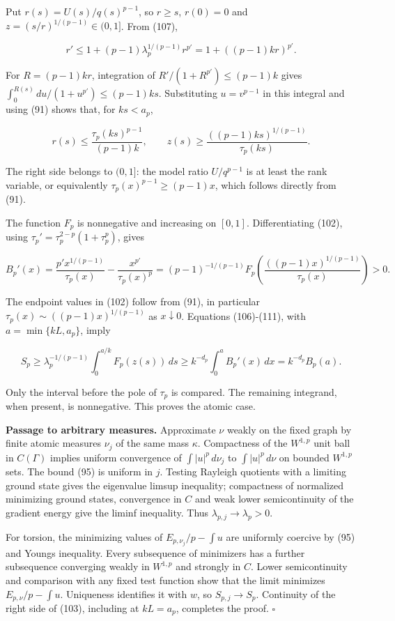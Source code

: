 \documentclass[11pt]{article}
\begin{document}
Put \(r(s)=U(s)/q(s)^{p-1}\), so \(r\ge s\), \(r(0)=0\) and
\(z=(s/r)^{1/(p-1)}\in(0,1]\). From (107),

\[
r'\le1+(p-1)\lambda_p^{1/(p-1)}r^{p'}
=1+((p-1)kr)^{p'}.
\tag{109}
\]

For \(R=(p-1)kr\), integration of \(R'/(1+R^{p'})\le(p-1)k\) gives
\(\int_0^{R(s)}du/(1+u^{p'})\le(p-1)ks\). Substituting \(u=v^{p-1}\) in
this integral and using (91) shows that, for \(ks<a_p\),

\[
r(s)\le\frac{\tau_p(ks)^{p-1}}{(p-1)k},
\qquad
z(s)\ge\frac{((p-1)ks)^{1/(p-1)}}{\tau_p(ks)}.
\tag{110}
\]

The right side belongs to \((0,1]\): the model ratio \(U/q^{p-1}\) is at
least the rank variable, or equivalently \(\tau_p(x)^{p-1}\ge(p-1)x\),
which follows directly from (91).

The function \(F_p\) is nonnegative and increasing on \([0,1]\).
Differentiating (102), using \(\tau_p'=\tau_p^{2-p}(1+\tau_p^p)\), gives

\[
B_p'(x)=\frac{p'x^{1/(p-1)}}{\tau_p(x)}
 -\frac{x^{p'}}{\tau_p(x)^p}
=(p-1)^{-1/(p-1)}
 F_p\left(\frac{((p-1)x)^{1/(p-1)}}{\tau_p(x)}\right)>0.
\tag{111}
\]

The endpoint values in (102) follow from (91), in particular
\(\tau_p(x)\sim((p-1)x)^{1/(p-1)}\) as \(x\downarrow0\). Equations
(106)-(111), with \(a=\min\{kL,a_p\}\), imply

\[
S_p\ge\lambda_p^{-1/(p-1)}\int_0^{a/k}F_p(z(s))\,ds
\ge k^{-d_p}\int_0^a B_p'(x)\,dx
=k^{-d_p}B_p(a).
\tag{112}
\]

Only the interval before the pole of \(\tau_p\) is compared. The
remaining integrand, when present, is nonnegative. This proves the
atomic case.

\textbf{Passage to arbitrary measures.} Approximate \(\nu\) weakly on
the fixed graph by finite atomic measures \(\nu_j\) of the same mass
\(\kappa\). Compactness of the \(W^{1,p}\) unit ball in \(C(\Gamma)\)
implies uniform convergence of \(\int |u|^p\,d\nu_j\) to
\(\int |u|^p\,d\nu\) on bounded \(W^{1,p}\) sets. The bound (95) is
uniform in \(j\). Testing Rayleigh quotients with a limiting ground
state gives the eigenvalue limsup inequality; compactness of normalized
minimizing ground states, convergence in \(C\) and weak lower
semicontinuity of the gradient energy give the liminf inequality. Thus
\(\lambda_{p,j}\to\lambda_p>0\).

For torsion, the minimizing values of \(E_{p,\nu_j}/p-\int u\) are
uniformly coercive by (95) and Young\textquotesingle s inequality. Every
subsequence of minimizers has a further subsequence converging weakly in
\(W^{1,p}\) and strongly in \(C\). Lower semicontinuity and comparison
with any fixed test function show that the limit minimizes
\(E_{p,\nu}/p-\int u\). Uniqueness identifies it with \(w\), so
\(S_{p,j}\to S_p\). Continuity of the right side of (103), including at
\(kL=a_p\), completes the proof. \(\square\)
\end{document}

